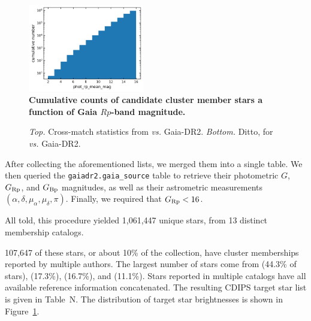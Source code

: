 \documentclass[12pt,twocolumn,tighten]{aastex62}
\begin{document}
\begin{figure}[t]
	\begin{center}
		\leavevmode
		\includegraphics[width=0.45\textwidth]{star_catalog_mag_histogram_phot_rp_mean_mag.png}
	\end{center}
	\vspace{-0.2cm}
	\caption{
    {\bf Cumulative counts of candidate cluster member stars a
    function of Gaia $Rp$-band magnitude.}
	\label{fig:cdips_targets}
	}
\end{figure}

\begin{figure}[!ht]
	\vspace{-0.8cm}
	\caption{
		{\it Top.} Cross-match statistics from \cite{Kharchenko_et_al_2013} {\it 
			vs.} Gaia-DR2.
		{\it Bottom.} Ditto, for \cite{dias_proper_2014} {\it vs.} Gaia-DR2.
	}
	\label{fig:xmatch_info}
\end{figure}


After collecting the aforementioned lists, we
merged them into a single table. We then queried the
\texttt{gaiadr2.gaia\_source} table to retrieve their photometric $G$,
$G_{\rm Rp}$, and $G_{\rm Bp}$ magnitudes, as well as their
astrometric measurements $(\alpha, \delta, \mu_\alpha, \mu_\delta,
\pi)$.  Finally, we required that $G_{\rm Rp} < 16$.  

All told, this procedure yielded 1{,}061{,}447 unique stars, from 13 distinct
membership catalogs.

107{,}647 of these stars, or about
10\% of the collection, have cluster memberships reported by
multiple authors.  The largest number of stars come from
\citealt{dias_proper_2014} (44.3\% of stars), \citealt{Kharchenko_et_al_2013}
(17.3\%), \citealt{cantat-gaudin_gaia_2018} (16.7\%), and \citealt{zari_3d_2018}
(11.1\%).
Stars reported in multiple catalogs have all available reference information
concatenated.  
The resulting CDIPS target star list is given in Table~N.
The distribution of target star brightnesses is shown in
Figure~\ref{fig:cdips_targets}.
\end{document}
